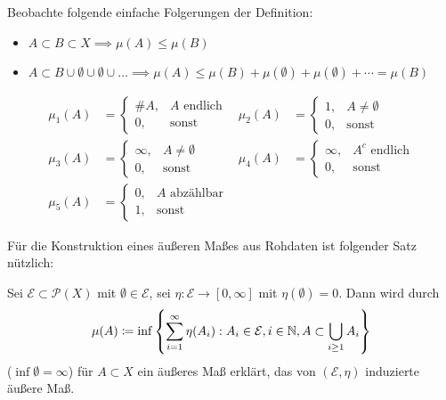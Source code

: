 \documentclass[a4paper,twoside,DIV15,BCOR12mm]{scrbook}
\begin{document}
Beobachte folgende einfache Folgerungen der Definition:

\begin{itemize}
\item $A\subset B \subset X \implies \mu(A)\le \mu(B)$
\item $A\subset B \cup \emptyset \cup \emptyset \cup \ldots \implies \mu(A) \le \mu(B) + \mu(\emptyset) + \mu(\emptyset) + \cdots = \mu(B)$
\end{itemize}

\begin{beispieleX}
\begin{align*}
\mu_1(A) &= 
\begin{cases}
\#A, & A \text{ endlich} \\
0, & \text{sonst}
\end{cases}
&
\mu_2(A) &= 
\begin{cases}
1, & A \ne \emptyset \\
0, & \text{sonst}
\end{cases} \\
\mu_3(A) &= 
\begin{cases}
\infty, & A \ne \emptyset \\
0, & \text{sonst}
\end{cases}
&
\mu_4(A) &= 
\begin{cases}
\infty, & A^c \text{ endlich} \\
0, & \text{sonst}
\end{cases} \\
\mu_5(A) &= 
\begin{cases}
0, & \text{$A$ abzählbar} \\
1, & \text{sonst}
\end{cases}
\end{align*}
\end{beispieleX}

Für die Konstruktion eines äußeren Maßes aus Rohdaten ist folgender Satz nützlich:

\begin{satz}
Sei $\mathcal E \subset \mathcal P (X)$ mit $\emptyset \in \mathcal E$, sei $\eta: \mathcal E \to [0,\infty]$ mit $\eta(\emptyset)=0$. Dann wird durch
\[
\mu(A) \da \inf\left\{\sum_{i=1}^\infty \eta(A_i) : A_i\in \mathcal E, i\in \MdN, A\subset\bigcup_{i\ge1}A_i\right\}
\]
($\inf\emptyset = \infty$) für $A\subset X$ ein äußeres Maß erklärt, das von $(\mathcal E, \eta)$ induzierte äußere Maß.
\end{satz}
\end{document}
